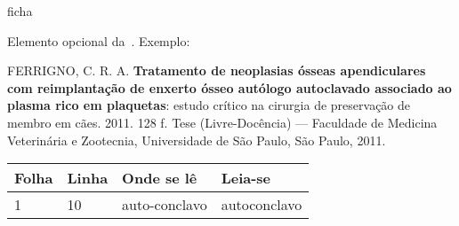 \frenchspacing                %

\imprimircapa{}
\imprimirfolhaderosto*    %

{ficha}

\begin{errata}
Elemento opcional da~. Exemplo:

\vspace{\onelineskip}

FERRIGNO, C. R. A. \textbf{Tratamento de neoplasias ósseas apendiculares com
  reimplantação de enxerto ósseo autólogo autoclavado associado ao plasma
  rico em plaquetas}: estudo crítico na cirurgia de preservação de membro em
cães. 2011. 128 f. Tese (Livre-Docência) --- Faculdade de Medicina Veterinária e
Zootecnia, Universidade de São Paulo, São Paulo, 2011.

\begin{table}[htb]
  \center{}
  \footnotesize
  \begin{tabular}{p{1.4cm}p{1cm}p{3cm}p{3cm}}
    \toprule
    \textbf{Folha} & \textbf{Linha} & \textbf{Onde se lê} & \textbf{Leia-se} \\
    \midrule
    1              & 10             & auto-conclavo       & autoconclavo     \\
    \bottomrule
  \end{tabular}
\end{table}

\end{errata}


